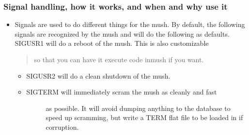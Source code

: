 \documentclass[letterpaper,10pt,english]{sphinxmanual}
\begin{document}
\subsubsection{Signal handling, how it works, and when and why use it}
\label{\detokenize{features:signal-handling-how-it-works-and-when-and-why-use-it}}\begin{itemize}
\item {} 
\sphinxAtStartPar
Signals are used to do different things for the mush.  By default,
the following signals are recognized by the mush and will do
the following as defaults.
\sphinxhyphen{} SIGUSR1 \sphinxhyphen{} will do a reboot of the mush.  This is also customizable
\begin{quote}

\sphinxAtStartPar
so that you can have it execute code in\sphinxhyphen{}mush if you want.
\end{quote}
\begin{itemize}
\item {} 
\sphinxAtStartPar
SIGUSR2 \sphinxhyphen{} will do a clean shutdown of the mush.

\item {} \begin{description}
\item[{SIGTERM \sphinxhyphen{} will immediately scram the mush as cleanly and fast}] \leavevmode
\sphinxAtStartPar
as possible.  It will avoid dumping anything to
the database to speed up scramming, but write
a TERM flat file to be loaded in if corruption.

\end{description}

\end{itemize}

\end{itemize}
\end{document}
